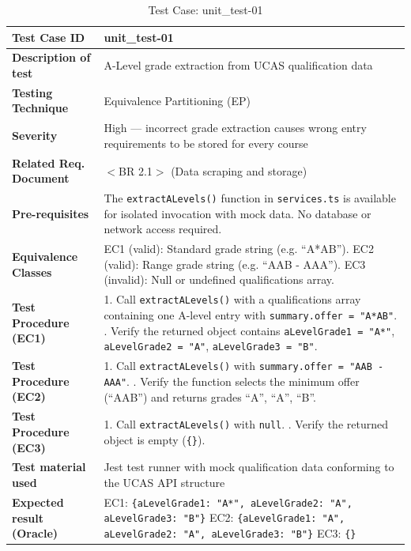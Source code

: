\begin{table}[h!]
\centering
\caption{Test Case: unit\_test-01}
\begin{tabular}{|p{}|p{}|}
\hline
\textbf{Test Case ID} & unit\_test-01 \\ \hline
\textbf{Description of test} & A-Level grade extraction from UCAS qualification data \\ \hline
\textbf{Testing Technique} & Equivalence Partitioning (EP) \\ \hline
\textbf{Severity} & High --- incorrect grade extraction causes wrong entry requirements to be stored for every course \\ \hline
\textbf{Related Req. Document} & $<$BR 2.1$>$ (Data scraping and storage) \\ \hline
\textbf{Pre-requisites} & The \texttt{extractALevels()} function in \texttt{services.ts} is available for isolated invocation with mock data. No database or network access required. \\ \hline
\textbf{Equivalence Classes} & EC1 (valid): Standard grade string (e.g. ``A*AB''). \newline EC2 (valid): Range grade string (e.g. ``AAB - AAA''). \newline EC3 (invalid): Null or undefined qualifications array. \\ \hline
\textbf{Test Procedure (EC1)} & 1. Call \texttt{extractALevels()} with a qualifications array containing one A-level entry with \texttt{summary.offer = "A*AB"}. \newline 2. Verify the returned object contains \texttt{aLevelGrade1 = "A*"}, \texttt{aLevelGrade2 = "A"}, \texttt{aLevelGrade3 = "B"}. \\ \hline
\textbf{Test Procedure (EC2)} & 1. Call \texttt{extractALevels()} with \texttt{summary.offer = "AAB - AAA"}. \newline 2. Verify the function selects the minimum offer (``AAB'') and returns grades ``A'', ``A'', ``B''. \\ \hline
\textbf{Test Procedure (EC3)} & 1. Call \texttt{extractALevels()} with \texttt{null}. \newline 2. Verify the returned object is empty (\texttt{\{\}}). \\ \hline
\textbf{Test material used} & Jest test runner with mock qualification data conforming to the UCAS API structure \\ \hline
\textbf{Expected result (Oracle)} & EC1: \texttt{\{aLevelGrade1: "A*", aLevelGrade2: "A", aLevelGrade3: "B"\}} \newline EC2: \texttt{\{aLevelGrade1: "A", aLevelGrade2: "A", aLevelGrade3: "B"\}} \newline EC3: \texttt{\{\}} \\ \hline

\end{tabular}
\end{table}
